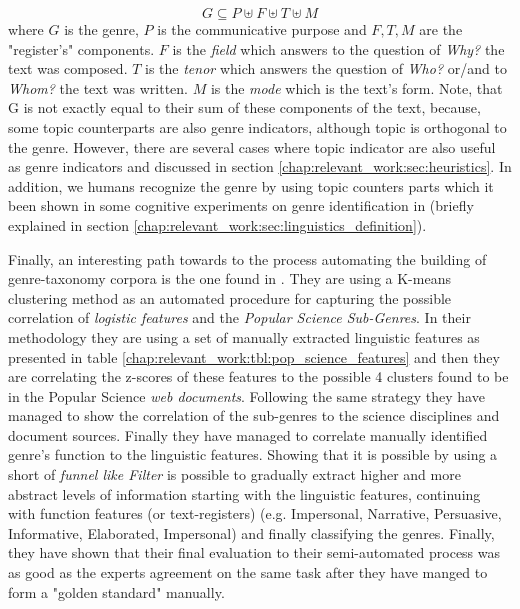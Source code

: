 \begin{equation}\label{eq:genre_notion_in_math}
	G  \subseteq P \uplus F \uplus T \uplus M
\end{equation}
\noindent
where $G$ is the genre, $P$ is the communicative purpose and $F, T, M$ are the "register's" components. $F$ is the \textit{field} which answers to the question of \textit{Why?} the text was composed. $T$ is the \textit{tenor} which answers the question of \textit{Who?} or/and to \textit{Whom?} the text was written. $M$ is the \textit{mode} which is the text's form. Note, that G is not exactly equal to their sum of these components of the text, because, some topic counterparts are also genre indicators, although topic is orthogonal to the genre. However, there are several cases where topic indicator are also useful as genre indicators and discussed in section \ref{chap:relevant_work:sec:heuristics}. In addition, we humans recognize the genre by using topic counters parts which it been shown in some cognitive experiments on genre identification in \parencite{clark2014you, lieungnapar2017genre} (briefly explained in section \ref{chap:relevant_work:sec:linguistics_definition}).

Finally, an interesting path towards to the process automating the building of genre-taxonomy corpora is the one found in \parencite{lieungnapar2017genre}. They are using a K-means clustering method as an automated procedure for capturing the possible correlation of \textit{logistic features} and the \textit{Popular Science Sub-Genres}. In their methodology they are using a set of manually extracted linguistic features as presented in table \ref{chap:relevant_work:tbl:pop_science_features} and then they are correlating the z-scores of these features to the possible 4 clusters found to be in the Popular Science \textit{web documents}. Following the same strategy they have managed to show the correlation of the sub-genres to the science disciplines and document sources. Finally they have managed to correlate manually identified genre's function to the linguistic features. Showing that it is possible by using a short of \textit{funnel like Filter} is possible to gradually extract higher and more abstract levels of information starting with the linguistic features, continuing with function features (or text-registers) (e.g. Impersonal, Narrative, Persuasive, Informative, Elaborated, Impersonal) and finally classifying the genres. Finally, they have shown that their final evaluation to their semi-automated process was as good as the experts agreement on the same task after they have manged to form a "golden standard" manually. 


